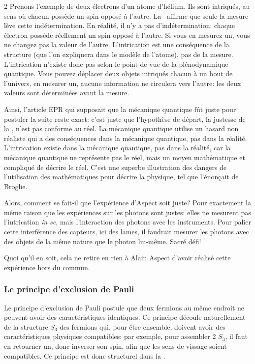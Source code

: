 \begin{multicols}{2}
Prenons l'exemple de deux électrons d'un atome d'hélium. Ils sont
intriqués, au sens où chacun possède un spin opposé à l'autre. La \MQ\
affirme que seule la mesure lève cette indétermination. En réalité, il
n'y a pas d'indétermination: chaque électron possède réellement un
spin opposé à l'autre. Si vous en mesurez un, vous ne changez pas la
valeur de l'autre. L'intrication est une conséquence de la structure
(que l'on expliquera dans le modèle de l'atome), pas de la mesure.
L'intrication n'existe donc pas selon le point de vue de la
plénodynamique quantique. Vous pouvez déplacer deux objets intriqués
chacun à un bout de l'univers, en mesurer un, aucune information ne
circulera vers l'autre: les deux valeurs sont déterminées avant la
mesure.

Ainsi, l'article EPR qui supposait que la mécanique quantique fût
juste pour postuler la suite reste exact: c'est juste que l'hypothèse
de départ, la justesse de la \MQ, n'est pas conforme au réel. La
mécanique quantique utilise un hasard non réaliste qui a des
conséquences dans la mécanique quantique, pas dans la réalité.
L'intrication existe dans la mécanique quantique, pas dans la réalité,
car la mécanique quantique ne représente pas le réel, mais un moyen
mathématique et compliqué de décrire le réel. C'est une superbe illustration 
des dangers de l'utilisation des mathématiques pour décrire la physique, tel que l'énonçait de Broglie\cite{debroglie1976physique}.

Alors, comment se fait-il que l'expérience d'Aspect soit juste? Pour
exactement la même raison que les expériences sur les photons sont
justes: elles ne mesurent pas l'intrication \textit{in se}, mais l'interaction
des photons avec les instruments. Pour palier cette interférence des
capteurs, ici des lames, il faudrait mesurer les photons avec des
objets de la même nature que le photon lui-même. Sacré défi!

Quoi qu'il en soit, cela ne retire en rien à Alain Aspect d'avoir réalisé
cette expérience hors du commun.

\subsubsection{Le principe d'exclusion de Pauli}

Le principe d'exclusion de Pauli postule que deux fermions au même
endroit ne peuvent avoir des caractéristiques identiques. Ce principe
découle naturellement de la structure $S_3$ des fermions qui, pour être
ensemble, doivent avoir des caractéristiques physiques compatibles:
par exemple, pour assembler 2 $S_3$, il faut en retourner un, donc
inverser son spin, afin que les sens de vissage soient compatibles. Ce
principe est donc structurel dans la \PQ.


\end{multicols}
